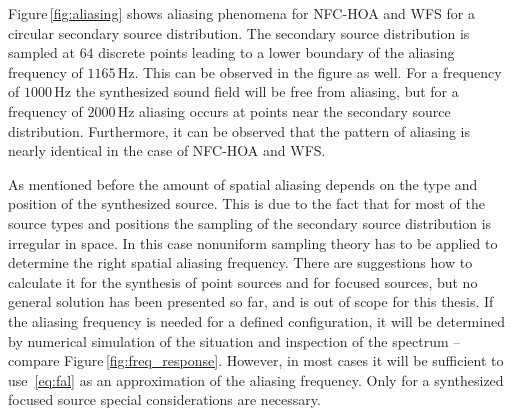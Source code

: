 %
\begin{figure*}[t]
    \small
    
    \caption{Sound pressure of a plane wave synthesized by
    \ac{NFC-HOA}~\protect\eqref{eq:D_nfchoa_pw_25D} and
    \ac{WFS}~\protect\eqref{eq:D_wfs_pw_25D} for different frequencies.
    For \ac{WFS} the open circles indicate inactive secondary sources.
    Parameters: $\xs = (0,-1,0)$, $\xref = (0,0,0)$\,m, 64 secondary sources. 
    }
    \label{fig:aliasing}
\end{figure*}
%
Figure\,\ref{fig:aliasing} shows aliasing phenomena for \ac{NFC-HOA} and
\ac{WFS} for a
circular secondary source distribution. The secondary source distribution
is sampled at $64$
discrete points leading to a lower boundary of the aliasing frequency of
$1165$\,Hz. This can be observed in the figure as well. For a frequency of
$1000$\,Hz the synthesized sound field will be free from aliasing, but for a
frequency of $2000$\,Hz aliasing occurs at points near the secondary source
distribution. Furthermore, it can be observed that the pattern of aliasing is nearly
identical in the case of \ac{NFC-HOA} and \ac{WFS}. 

As mentioned before the amount of spatial aliasing depends on the type
and position of the synthesized source. This is due to the fact that for most
of the source types and positions the sampling of the
secondary source distribution is irregular in space. In this case
nonuniform sampling theory has to be applied to determine the right spatial aliasing
frequency. There are suggestions how to calculate it for the synthesis of point
sources\autocite{Corteel2006} and for focused sources\autocite{Oldfield2013},
but no general solution has been presented so far, and is out of scope for
this thesis.
If the aliasing frequency is needed for a
defined configuration, it will be
determined by numerical simulation of the situation and inspection of the
spectrum -- compare Figure\,\ref{fig:freq_response}.
However, in most cases it will be sufficient to use~\eqref{eq:fal} as an approximation of
the aliasing frequency. Only for a synthesized focused source special
considerations are necessary.

